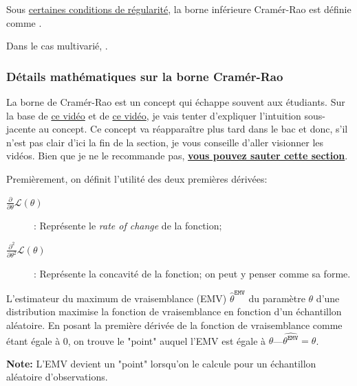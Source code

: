 \documentclass[french]{article}
\begin{document}
\begin{multicols*}{2}
\begin{definitionNOHFILL}
Sous \hyperlink{reg_cond}{\color{blue!40!green!80!black}certaines conditions de régularité}, la borne inférieure Cramér-Rao est définie comme .

\tcbline

Dans le cas multivarié, .
\end{definitionNOHFILL}



\subsubsection*{Détails mathématiques sur la borne Cramér-Rao}
La borne de Cramér-Rao est un concept qui échappe souvent aux étudiants. Sur la base de \hyperlink{https://www.youtube.com/watch?v=igQIsYAlKlY}{\color{blue}ce vidéo} et de \hyperlink{https://www.youtube.com/watch?v=i0JiSddCXMM}{\color{blue}ce vidéo}, je vais tenter d'expliquer l'intuition sous-jacente au concept. Ce concept va réapparaître plus tard dans le bac et donc, s’il n’est pas clair d’ici la fin de la section, je vous conseille d’aller visionner les vidéos.	Bien que je ne le recommande pas, \textbf{\underline{vous pouvez sauter cette section}}.

\bigskip

Premièrement, on définit l'utilité des deux premières dérivées:
\begin{description}
	\item[$\frac{\partial}{\partial\theta} \mathcal{L}(\theta)$]: Représente le \og \textit{rate of change}\fg{} de la fonction;
	\item[$\frac{\partial^{2}}{\partial\theta^{2}} \mathcal{L}(\theta)$]: Représente la concavité de la fonction; on peut y penser comme sa forme.
\end{description}

L'estimateur du maximum de vraisemblance (EMV) $\hat\theta^{\texttt{EMV}}$ du paramètre $\theta$ d'une distribution maximise la fonction de vraisemblance en fonction d'un échantillon aléatoire. En posant la première dérivée de la fonction de vraisemblance comme étant égale à 0, on trouve le "point" auquel l'EMV est égale à $\theta$---$\hat{\theta^{\texttt{EMV}}}	=	\theta$. 

\bigskip

\textbf{Note:}	L'EMV devient un "point" lorsqu'on le calcule pour un échantillon aléatoire d'observations.


\end{multicols*}
\end{document}
